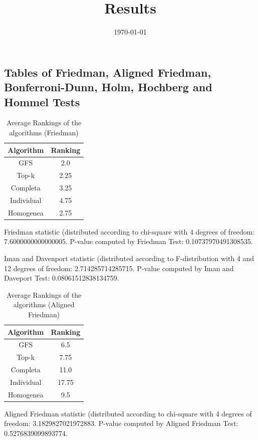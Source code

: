 \documentclass[a4paper,10pt]{article}
\title{Results}
\author{}
\date{\today}
\begin{document}
\begin{landscape}
\oddsidemargin 0in \topmargin 0in\maketitle
\section{Tables of Friedman, Aligned Friedman, Bonferroni-Dunn, Holm, Hochberg and Hommel Tests}
\begin{table}[!htp]
\centering
\caption{Average Rankings of the algorithms (Friedman)
}\begin{tabular}{c|c}
Algorithm&Ranking\\
\hline
GFS&2.0\\
Top-k&2.25\\
Completa&3.25\\
Individual&4.75\\
Homogenea&2.75\\
\end{tabular}
\end{table}


Friedman statistic (distributed according to chi-square with 4 degrees of freedom: 7.6000000000000005. 
P-value computed by Friedman Test: 0.10737970491308535.\newline

Iman and Davenport statistic (distributed according to F-distribution with 4 and 12 degrees of freedom: 2.714285714285715. 
P-value computed by Iman and Daveport Test: 0.08061512838134759.\newline


\newpage

\begin{table}[!htp]
\centering
\caption{Average Rankings of the algorithms (Aligned Friedman)
}\begin{tabular}{c|c}
Algorithm&Ranking\\
\hline
GFS&6.5\\
Top-k&7.75\\
Completa&11.0\\
Individual&17.75\\
Homogenea&9.5\\
\end{tabular}
\end{table}


Aligned Friedman statistic (distributed according to chi-square with 4 degrees of freedom: 3.1829827021972883. 
P-value computed by Aligned Friedman Test: 0.5276839099893774.\newline



\end{landscape}
\end{document}
